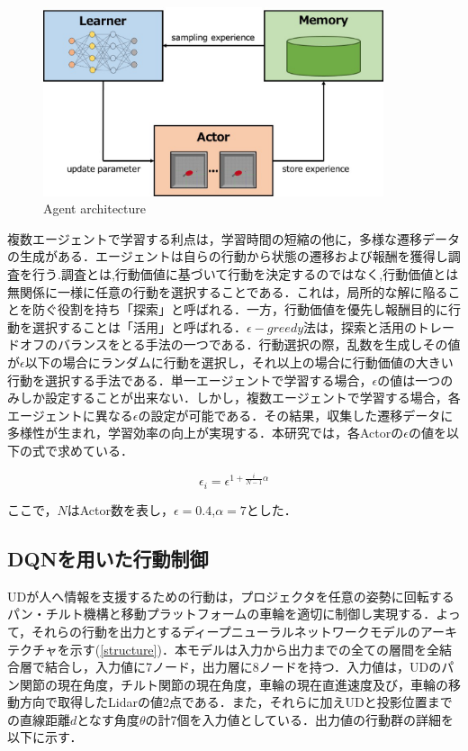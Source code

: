 \documentclass[12pt]{sonota/aislab}
\begin{document}
\begin{figure}[t]
\begin{center}
\includegraphics[clip, width=10cm]{figs/apex_agent_structure.eps}
\caption{Agent architecture}
\label{agent_architecture}
\end{center}
\end{figure}

複数エージェントで学習する利点は，学習時間の短縮の他に，多様な遷移データの生成がある．エージェントは自らの行動から状態の遷移および報酬を獲得し調査を行う.調査とは,行動価値に基づいて行動を決定するのではなく,行動価値とは無関係に一様に任意の行動を選択することである．これは，局所的な解に陥ることを防ぐ役割を持ち「探索」と呼ばれる．一方，行動価値を優先し報酬目的に行動を選択することは「活用」と呼ばれる．$\epsilon-greedy$法は，探索と活用のトレードオフのバランスをとる手法の一つである．行動選択の際，乱数を生成しその値が$\epsilon$以下の場合にランダムに行動を選択し，それ以上の場合に行動価値の大きい行動を選択する手法である．単一エージェントで学習する場合，$\epsilon$の値は一つのみしか設定することが出来ない．しかし，複数エージェントで学習する場合，各エージェントに異なる$\epsilon$の設定が可能である．その結果，収集した遷移データに多様性が生まれ，学習効率の向上が実現する．本研究では，各Actorの$\epsilon$の値を以下の式で求めている．

\begin{equation}
\label{sum_P_i}
  \epsilon_{i}=\epsilon^{1+\frac{i}{N-1}\alpha}
\end{equation}

ここで，$N$はActor数を表し，$\epsilon=0.4$,$\alpha=7$とした．

\subsection{DQNを用いた行動制御}
UDが人へ情報を支援するための行動は，プロジェクタを任意の姿勢に回転するパン・チルト機構と移動プラットフォームの車輪を適切に制御し実現する．よって，それらの行動を出力とするディープニューラルネットワークモデルのアーキテクチャを示す(\ref{structure})．本モデルは入力から出力までの全ての層間を全結合層で結合し，入力値に7ノード，出力層に8ノードを持つ．入力値は，UDのパン関節の現在角度，チルト関節の現在角度，車輪の現在直進速度及び，車輪の移動方向で取得したLidarの値2点である．また，それらに加えUDと投影位置までの直線距離$d$となす角度$\theta$の計7個を入力値としている．出力値の行動群の詳細を以下に示す．
\end{document}
